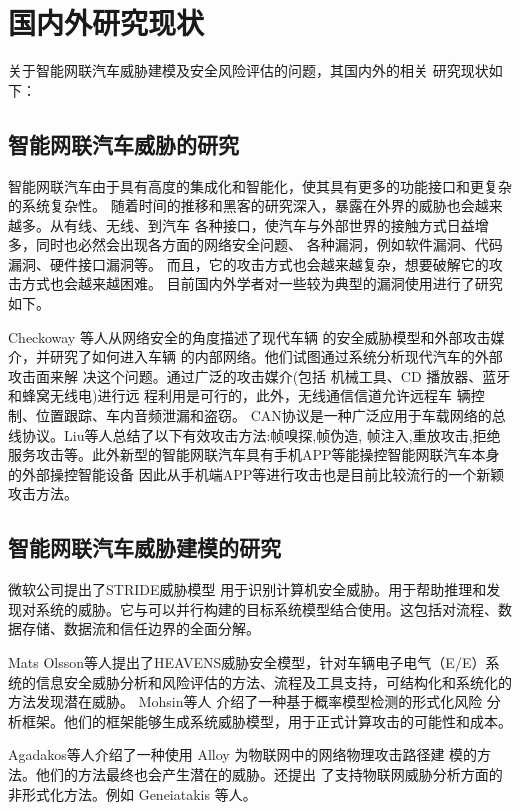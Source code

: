 \section{国内外研究现状}
关于智能网联汽车威胁建模及安全风险评估的问题，其国内外的相关
研究现状如下：

\subsection{智能网联汽车威胁的研究}
智能网联汽车由于具有高度的集成化和智能化，使其具有更多的功能接口和更复杂的系统复杂性。
随着时间的推移和黑客的研究深入，暴露在外界的威胁也会越来越多。从有线、无线、到汽车
各种接口，使汽车与外部世界的接触方式日益增多，同时也必然会出现各方面的网络安全问题、
各种漏洞，例如软件漏洞、代码漏洞、硬件接口漏洞等。
而且，它的攻击方式也会越来越复杂，想要破解它的攻击方式也会越来越困难。
目前国内外学者对一些较为典型的漏洞使用进行了研究如下。

Checkoway\cite{checkoway2011comprehensive} 等人从网络安全的角度描述了现代车辆
的安全威胁模型和外部攻击媒介，并研究了如何进入车辆
的内部网络。他们试图通过系统分析现代汽车的外部攻击面来解
决这个问题。通过广泛的攻击媒介(包括
机械工具、CD 播放器、蓝牙和蜂窝无线电)进行远
程利用是可行的，此外，无线通信信道允许远程车
辆控制、位置跟踪、车内音频泄漏和盗窃。
CAN协议是一种广泛应用于车载网络的总线协议。Liu\cite{liu2017vehicle}等人总结了以下有效攻击方法:帧嗅探,帧伪造,
帧注入,重放攻击,拒绝服务攻击等。此外新型的智能网联汽车具有手机APP等能操控智能网联汽车本身的外部操控智能设备
因此从手机端APP等进行攻击也是目前比较流行的一个新颖攻击方法。

\subsection{智能网联汽车威胁建模的研究}
微软公司提出了STRIDE威胁模型 \cite{kohnfelder1999threats} 用于识别计算机安全威胁。用于帮助推理和发现对系统的威胁。它与可以并行构建的目标系统模型结合使用。这包括对流程、数据存储、数据流和信任边界的全面分解。

Mats Olsson等人提出了HEAVENS威胁安全模型\cite{lautenbach2021proposing}，针对车辆电子电气（E/E）系统的信息安全威胁分析和风险评估的方法、流程及工具支持，可结构化和系统化的方法发现潜在威胁。
Mohsin等人\cite{mohsin2017iotriskanalyzer} 介绍了一种基于概率模型检测的形式化风险
分析框架。他们的框架能够生成系统威胁模型，用于正式计算攻击的可能性和成本。

Agadakos\cite{agadakos2017jumping}等人介绍了一种使用 Alloy 为物联网中的网络物理攻击路径建
模的方法。他们的方法最终也会产生潜在的威胁。还提出
了支持物联网威胁分析方面的非形式化方法。例如
Geneiatakis 等人。


